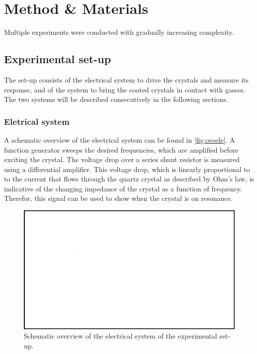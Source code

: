\section{Method \& Materials}
Multiple experiments were conducted with gradually increasing complexity. 

\subsection{Experimental set-up}
The set-up consists of the electrical system to drive the crystals and measure its response, and of the system to bring the coated crystals in contact with gasses. The two systems will be described consecutively in the following sections.

\subsubsection{Eletrical system}
A schematic overview of the electrical system can be found in \autoref{fig:oveele}. A function generator sweeps the desired frequencies, which are amplified before exciting the crystal. The voltage drop over a series shunt resistor is measured using a differential amplifier. This voltage drop, which is linearly proportional to to the current that flows through the quartz crystal as described by Ohm's law, is indicative of the changing impedance of the crystal as a function of frequency. Therefor, this signal can be used to show when the crystal is on resonance. 
\begin{figure}
	\centering
		\includegraphics[width=\textwidth]{figures/placeholder.png}
	\caption{Schematic overview of the electrical system of the experimental set-up. }
	\label{fig:oveele}
\end{figure}

